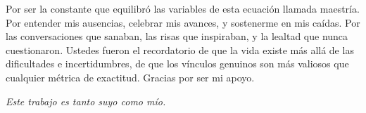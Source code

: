 \noindent
Por ser la constante que equilibró las variables de esta ecuación llamada maestría. Por entender mis ausencias, celebrar mis avances, y sostenerme en mis caídas. Por las conversaciones que sanaban, las risas que inspiraban, y la lealtad que nunca cuestionaron. Ustedes fueron el recordatorio de que la vida existe más allá de las dificultades e incertidumbres, de que los vínculos genuinos son más valiosos que cualquier métrica de exactitud. Gracias por ser mi apoyo.

\vspace{1cm}

\begin{center}
\textit{Este trabajo es tanto suyo como mío.}
\end{center}

\vspace*{\fill}
